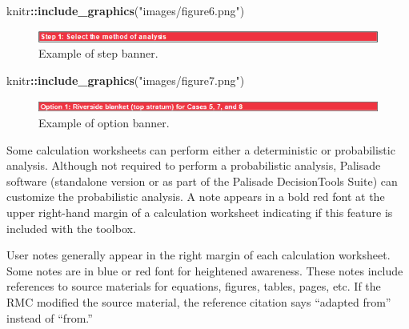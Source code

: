 \documentclass[
]{book}
\newenvironment{Shaded}{\begin{snugshade}}{\end{snugshade}}
\newcommand{\FunctionTok}[1]{\textcolor[rgb]{0.13,0.29,0.53}{\textbf{#1}}}
\newcommand{\NormalTok}[1]{#1}
\newcommand{\SpecialCharTok}[1]{\textcolor[rgb]{0.81,0.36,0.00}{\textbf{#1}}}
\newcommand{\StringTok}[1]{\textcolor[rgb]{0.31,0.60,0.02}{#1}}
\begin{document}
\begin{Shaded}
\begin{Highlighting}[]
\NormalTok{knitr}\SpecialCharTok{::}\FunctionTok{include\_graphics}\NormalTok{(}\StringTok{"images/figure6.png"}\NormalTok{)}
\end{Highlighting}
\end{Shaded}

\begin{figure}

{\centering \includegraphics{images/figure6} 

}

\caption{Example of step banner.}\label{fig:figure-6}
\end{figure}

\begin{Shaded}
\begin{Highlighting}[]
\NormalTok{knitr}\SpecialCharTok{::}\FunctionTok{include\_graphics}\NormalTok{(}\StringTok{"images/figure7.png"}\NormalTok{)}
\end{Highlighting}
\end{Shaded}

\begin{figure}

{\centering \includegraphics{images/figure7} 

}

\caption{Example of option banner.}\label{fig:figure-7}
\end{figure}

Some calculation worksheets can perform either a deterministic or probabilistic analysis. Although not required to perform a probabilistic analysis, Palisade \citet{RISK} software (standalone version or as part of the Palisade DecisionTools Suite) can customize the probabilistic analysis. A note appears in a bold red font at the upper right-hand margin of a calculation worksheet indicating if this feature is included with the toolbox.

User notes generally appear in the right margin of each calculation worksheet. Some notes are in blue or red font for heightened awareness. These notes include references to source materials for equations, figures, tables, pages, etc. If the RMC modified the source material, the reference citation says ``adapted from'' instead of ``from.''
\end{document}
